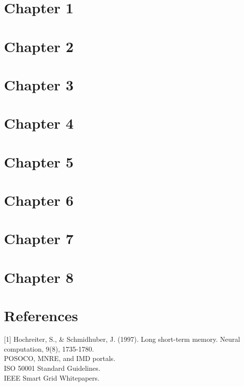 \documentclass[12pt,a4paper]{report}
\begin{document}
\tableofcontents
\listoffigures
\listoftables

\chapter{Chapter 1}

\chapter{Chapter 2}

\chapter{Chapter 3}

\chapter{Chapter 4}

\chapter{Chapter 5}

\chapter{Chapter 6}

\chapter{Chapter 7}

\chapter{Chapter 8}


\chapter*{References}
[1] Hochreiter, S., & Schmidhuber, J. (1997). Long short-term memory. Neural computation, 9(8), 1735-1780.\\
[2] POSOCO, MNRE, and IMD portals.\\
[3] ISO 50001 Standard Guidelines.\\
[4] IEEE Smart Grid Whitepapers.\\
\end{document}
